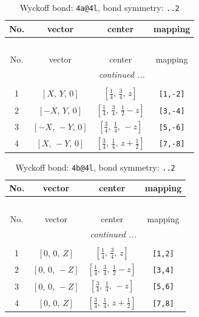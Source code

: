 \documentclass[fleqn,8pt]{jsarticle}
\begin{document}
\begin{longtable}{cccc}
\caption{Wyckoff bond: {\tt 4a@4l}, bond symmetry: {\tt ..2}}
 \\
 \hline \hline
No. & vector & center & mapping \\ \hline \endfirsthead

\multicolumn{3}{l}{\tablename\ \thetable{}} \\
 \hline \hline
No. & vector & center & mapping \\ \hline \endhead

 \hline \hline
\multicolumn{3}{r}{\footnotesize\it continued ...} \\ \endfoot

 \hline \hline
\multicolumn{3}{r}{} \\ \endlastfoot

1 & $\left[ X,\, Y,\, 0 \right]$ & $\left[ \frac{1}{4},\, \frac{3}{4},\, z \right]$ & {\tt [1,-2]} \\ \hline
2 & $\left[ - X,\, Y,\, 0 \right]$ & $\left[ \frac{1}{4},\, \frac{3}{4},\, \frac{1}{2} - z \right]$ & {\tt [3,-4]} \\ \hline
3 & $\left[ - X,\, - Y,\, 0 \right]$ & $\left[ \frac{3}{4},\, \frac{1}{4},\, - z \right]$ & {\tt [5,-6]} \\ \hline
4 & $\left[ X,\, - Y,\, 0 \right]$ & $\left[ \frac{3}{4},\, \frac{1}{4},\, z + \frac{1}{2} \right]$ & {\tt [7,-8]} \\
\end{longtable}
\renewcommand{\arraystretch}{1.2}
\begin{longtable}{cccc}
\caption{Wyckoff bond: {\tt 4b@4l}, bond symmetry: {\tt ..2}}
 \\
 \hline \hline
No. & vector & center & mapping \\ \hline \endfirsthead

\multicolumn{3}{l}{\tablename\ \thetable{}} \\
 \hline \hline
No. & vector & center & mapping \\ \hline \endhead

 \hline \hline
\multicolumn{3}{r}{\footnotesize\it continued ...} \\ \endfoot

 \hline \hline
\multicolumn{3}{r}{} \\ \endlastfoot

1 & $\left[ 0,\, 0,\, Z \right]$ & $\left[ \frac{1}{4},\, \frac{3}{4},\, z \right]$ & {\tt [1,2]} \\ \hline
2 & $\left[ 0,\, 0,\, - Z \right]$ & $\left[ \frac{1}{4},\, \frac{3}{4},\, \frac{1}{2} - z \right]$ & {\tt [3,4]} \\ \hline
3 & $\left[ 0,\, 0,\, - Z \right]$ & $\left[ \frac{3}{4},\, \frac{1}{4},\, - z \right]$ & {\tt [5,6]} \\ \hline
4 & $\left[ 0,\, 0,\, Z \right]$ & $\left[ \frac{3}{4},\, \frac{1}{4},\, z + \frac{1}{2} \right]$ & {\tt [7,8]} \\
\end{longtable}
\end{document}

